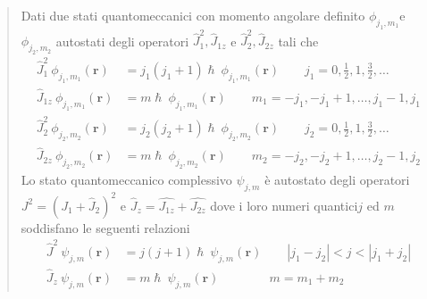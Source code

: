 \begin{quote}
    Dati due stati quantomeccanici con momento angolare definito
    \(\phi_{j_{1},m_{1}}\)e \(\phi_{j_{2},m_{2}}\) autostati degli operatori
    \(\hat{J}_{1}^2,\hat{J}_{1z}\) e \(\hat{J}_{2}^2, \hat{J}_{2z}\) tali che
    \begin{equation}
        \begin{aligned}
            \hat{J}_{1}^{2} \ \phi_{j_{1},m_{1}}(\bm{r}) &= j_{1}(j_{1}+1) \hslash \ \phi_{j_{1},m_{1}}(\bm{r}) \qquad j_{1} = 0, \frac{1}{2}, 1, \frac{3}{2}, \dots\\
            \hat{J}_{1z} \ \phi_{j_{1},m_{1}}(\bm{r}) &= m \hslash \ \phi_{j_{1},m_{1}}(\bm{r})  \qquad m_{1} = -j_{1} , -j_{1} +1, \dots , j_{1}-1, j_{1}
        \end{aligned}
        \label{eq:angular-momentum-theorem-1}
    \end{equation}
    \begin{equation}
        \begin{aligned}
            \hat{J}_{2}^{2} \ \phi_{j_{2},m_{2}}(\bm{r}) &= j_{2}(j_{2}+1) \hslash \ \phi_{j_{2},m_{2}}(\bm{r}) \qquad j_{2} = 0, \frac{1}{2}, 1, \frac{3}{2}, \dots\\
            \hat{J}_{2z} \ \phi_{j_{2},m_{2}}(\bm{r}) &= m \hslash \ \phi_{j_{2},m_{2}}(\bm{r})  \qquad m_{2} = -j_{2} , -j_{2} +1, \dots , j_{2}-1, j_{2}
        \end{aligned}
        \label{eq:angular-momentum-theorem-2}
    \end{equation}
    Lo stato quantomeccanico complessivo \(\psi_{j,m}\) è autostato degli
    operatori \(J^{2} = (J_{1} + \hat{J}_{2})^{2}\) e
    \(\hat{J}_{z} = \hat{J_{1z}} + \hat{J_{2z}}\) dove i loro numeri
    quantici\(j\) ed \(m\) soddisfano le seguenti relazioni
    \begin{equation}
        \begin{aligned}
            \hat{J}^{2} \ \psi_{j,m}(\bm{r}) &= j(j+1) \hslash \ \psi_{j,m}(\bm{r}) \qquad | j_{1} - j_{2}|<j<|j_{1}+j_{2}|\\
            \hat{J}_{z} \ \psi_{j,m}(\bm{r}) &= m \hslash \ \psi_{j,m}(\bm{r})  \qquad \qquad m = m_{1}+m_{2}
        \end{aligned}
        \label{eq:angular-momentum-theorem-3}
    \end{equation}
\end{quote}

